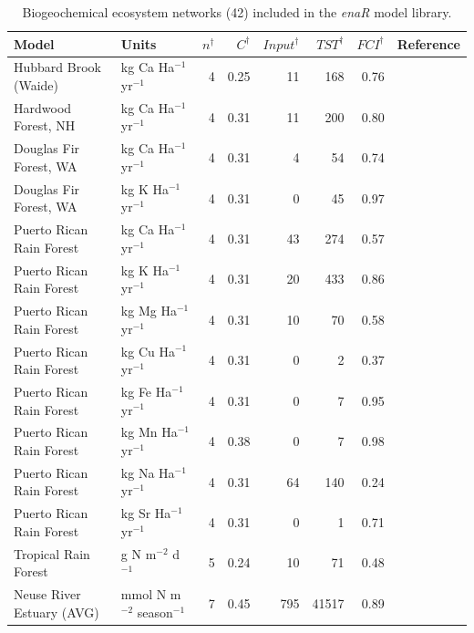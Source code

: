 \documentclass[11pt]{article}
\begin{document}
\begin{table}[ht]
\begin{center}
  \caption{Biogeochemical ecosystem networks (42) included in the
    \textit{enaR} model library.} \label{tab:BGC}
  \begin{tiny}
    \begin{tabular}{llrrrrrr}
      \hline
      Model & Units & $n^\dagger$ & $C^\dagger$ & $Input^\dagger$ & $TST^\dagger$ & $FCI^\dagger$ & Reference \\ 
      \hline
      Hubbard Brook (Waide) & kg Ca Ha$^{-1}$  yr$^{-1}$ &   4 & 0.25 &  11 & 168 & 0.76 & \citet{waide74} \\ 
      Hardwood Forest, NH & kg Ca Ha$^{-1}$  yr$^{-1}$ &   4 & 0.31 &  11 & 200 & 0.80 & \citet{jordan72} \\ 
      Douglas Fir Forest, WA  & kg Ca Ha$^{-1}$  yr$^{-1}$ &   4 & 0.31 &   4 &  54 & 0.74 & \citet{jordan72} \\ 
      Douglas Fir Forest, WA  & kg K Ha$^{-1}$  yr$^{-1}$ &   4 & 0.31 &   0 &  45 & 0.97 & \citet{jordan72} \\ 
      Puerto Rican Rain Forest & kg Ca Ha$^{-1}$  yr$^{-1}$ &   4 & 0.31 &  43 & 274 & 0.57 & \citet{jordan72} \\ 
      Puerto Rican Rain Forest & kg K Ha$^{-1}$  yr$^{-1}$ &   4 & 0.31 &  20 & 433 & 0.86 & \citet{jordan72} \\ 
      Puerto Rican Rain Forest & kg Mg Ha$^{-1}$  yr$^{-1}$ &   4 & 0.31 &  10 &  70 & 0.58 & \citet{jordan72} \\ 
      Puerto Rican Rain Forest & kg Cu Ha$^{-1}$  yr$^{-1}$ &   4 & 0.31 &   0 &   2 & 0.37 & \citet{jordan72} \\ 
      Puerto Rican Rain Forest & kg Fe Ha$^{-1}$  yr$^{-1}$ &   4 & 0.31 &   0 &   7 & 0.95 & \citet{jordan72} \\ 
      Puerto Rican Rain Forest & kg Mn Ha$^{-1}$  yr$^{-1}$ &   4 & 0.38 &   0 &   7 & 0.98 & \citet{jordan72} \\ 
      Puerto Rican Rain Forest & kg Na Ha$^{-1}$  yr$^{-1}$ &   4 & 0.31 &  64 & 140 & 0.24 & \citet{jordan72} \\ 
      Puerto Rican Rain Forest & kg Sr Ha$^{-1}$  yr$^{-1}$ &   4 & 0.31 &   0 &   1 & 0.71 & \citet{jordan72} \\ 
      Tropical Rain Forest & g N m$^{-2}$ d$^{-1}$  &   5 & 0.24 &  10 &  71 & 0.48 & \citet{edmisten70} \\ 
      Neuse River Estuary (AVG) & mmol N m$^{-2}$ season$^{-1}$ &   7 & 0.45 & 795 & 41517 & 0.89 & \citet{christian03} \\ 

\end{tabular}
\end{tiny}
\end{center}
\end{table}
\end{document}

